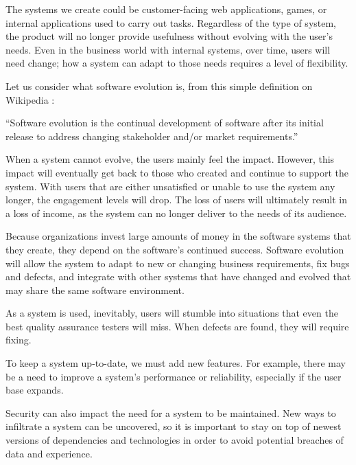 \documentclass[12pt,conference]{IEEEtran}
\begin{document}
The systems we create could be customer-facing web applications, games, or internal applications used to carry out tasks. Regardless of the type of system, the product will no longer provide usefulness without evolving with the user's needs. Even in the business world with internal systems, over time, users will need change; how a system can adapt to those needs requires a level of flexibility.

Let us consider what software evolution is, from this simple definition on Wikipedia \cite{wiki:software-evolution}:

\vspace{0.25cm}

\begin{displayquote}
``Software evolution is the continual development of software after its initial release to address changing stakeholder and/or market requirements.''
\end{displayquote}

\vspace{0.25cm}


When a system cannot evolve, the users mainly feel the impact. However, this impact will eventually get back to those who created and continue to support the system. With users that are either unsatisfied or unable to use the system any longer, the engagement levels will drop. The loss of users will ultimately result in a loss of income, as the system can no longer deliver to the needs of its audience.

Because organizations invest large amounts of money in the software systems that they create, they depend on the software's continued success. Software evolution will allow the system to adapt to new or changing business requirements, fix bugs and defects, and integrate with other systems that have changed and evolved that may share the same software environment.

As a system is used, inevitably, users will stumble into situations that even the best quality assurance testers will miss. When defects are found, they will require fixing. 

To keep a system up-to-date, we must add new features. For example, there may be a need to improve a system's performance or reliability, especially if the user base expands.

Security can also impact the need for a system to be maintained. New ways to infiltrate a system can be uncovered, so it is important to stay on top of newest versions of dependencies and technologies in order to avoid potential breaches of data and experience.
\end{document}
